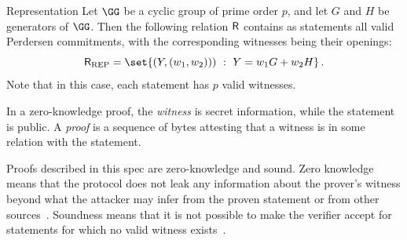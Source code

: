 \documentclass[11pt]{article}
\begin{document}
\begin{example}{Representation}{}
  Let $\GG$ be a cyclic group of prime order $p$, and let $G$ and $H$ be generators of $\GG$.
	Then the following relation $\mathsf{R}$ contains as statements all valid Perdersen commitments, with the corresponding witnesses being their openings:
  $$
	  \relation_{\operatorname{REP}} = \set{\left(\statement,(\witness_1,\witness_2))\right)~:~\statement=\witness_1G + \witness_2H}\,.
	$$
	Note that in this case, each statement has $p$ valid witnesses.
\end{example}

In a zero-knowledge proof, the \emph{witness} is secret information, while the statement is public.
A \emph{proof} is a sequence of bytes attesting that a witness is in some relation with the statement.

Proofs described in this spec are zero-knowledge and sound.
Zero knowledge means that the protocol does not leak any information about the prover's witness beyond what the attacker may infer from the proven statement or from other sources~\cite[1.6.4]{zkproof-reference}.
Soundness means that it is not possible to make the verifier accept for statements for which no valid witness exists~\cite[1.6.2]{zkproof-reference}.


\end{document}
